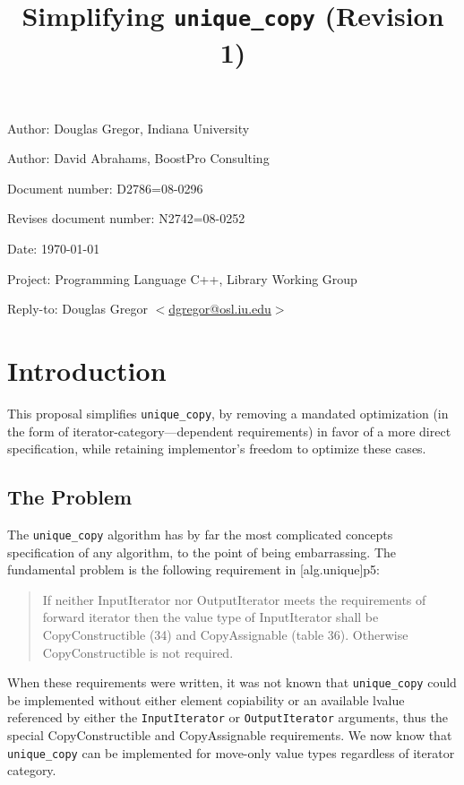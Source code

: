 \documentclass[american]{article}
\newcommand{\code}[1]{\lstinline[basicstyle=\sffamily,keywords={}]{#1}}
\newcommand{\tcode}[1]{\code{#1}}
\begin{document}
\pagestyle{myheadings}

\title{Simplifying \tcode{unique_copy} (Revision 1)}
\author{}

\date{}
\maketitle
\vspace{-0.5in}
\par\noindent Author: Douglas Gregor, Indiana University
\par\noindent Author: David Abrahams, BoostPro Consulting
\par\noindent Document number: D2786=08-0296
\par\noindent Revises document number: N2742=08-0252
\par\noindent Date: \today
\par\noindent Project: Programming Language C++, Library Working Group
\par\noindent Reply-to: Douglas Gregor $<$\href{mailto:dgregor@osl.iu.edu}{dgregor@osl.iu.edu}$>$

\section{Introduction}
This proposal simplifies \tcode{unique_copy}, by removing a mandated
optimization (in the form of iterator-category---dependent requirements)
in favor of a more direct specification, while retaining implementor's
freedom to optimize these cases.

\subsection{The Problem}
The \tcode{unique_copy} algorithm has by far the most complicated
concepts specification of any algorithm, to the point of being
embarrassing. The fundamental problem is
the following requirement in [alg.unique]p5:

\begin{quote}
  If neither InputIterator nor OutputIterator meets the requirements
  of forward iterator then the value type of InputIterator shall be
  CopyConstructible (34) and CopyAssignable (table 36). Otherwise
  CopyConstructible is not required.
\end{quote}

When these requirements were written, it was not known that \tcode{unique_copy}
could be implemented without either element copiability or an available lvalue
referenced by either the \tcode{InputIterator} or \tcode{OutputIterator}
arguments, thus the special CopyConstructible and CopyAssignable requirements.
We now know that \tcode{unique_copy} can be implemented for move-only value
types regardless of iterator category.
\end{document}
